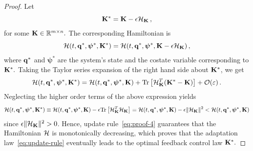 \documentclass[
12pt,draftcls,onecolumn%
]{IEEEtran}
\newtheorem{remark}{Remark}
\begin{document}
\begin{proof}
Let 
%
\begin{equation}
{\bf K}^* = {\bf K} - \epsilon {\cal H}_{{\bf K}} \thinspace ,
\label{eq:proof-4}
\end{equation}
%
for some ${\bf K} \in \mathbb{R}^{m\times n}.$  The corresponding Hamiltonian is 
%
\begin{equation*}
{\cal H} (t,{\bf q}^*,\bm{\psi}^*,{\bf K}^*) 
={\cal H} (t,{\bf q}^*,\bm{\psi}^*,{\bf K}-\epsilon {\cal H}_{{\bf K}}) \thinspace ,
\end{equation*}
%
where ${\bf q}^*$ and $\bm{\psi}^*$ are the system's state and the costate variable corresponding to ${\bf K}^*.$ Taking the Taylor series expansion of the right hand side about ${\bf K}^*$, we get
%
\begin{equation*}
  {\cal H} (t,{\bf q}^*,\bm{\psi}^*,{\bf K}^*)  = {\cal H} (t,{\bf q}^*,\bm{\psi}^*,{\bf K}) 
  +\mathrm{Tr} \left[{\cal H}_{{\bf K}}^T{\bf (K^*-K)}\right]+{\cal O}(\varepsilon) \thinspace .
\end{equation*}
%
Neglecting the higher order terms of the above expression yields
%
\begin{equation*}
\begin{split}
  {\cal H} (t,{\bf q}^*,\bm{\psi}^*,{\bf K}^*) \equiv {\cal H} (t,{\bf q}^*,\bm{\psi}^*,{\bf K}) 
  -\epsilon \mathrm{Tr}\left[{\cal H}_{{\bf K}}^T {\cal H}_{{\bf K}}\right]
   = {\cal H} (t,{\bf q}^*,\bm{\psi}^*,{\bf K}) -\epsilon\|{\cal H}_{{\bf K}}\|^2
 < {\cal H} (t,{\bf q}^*,\bm{\psi}^*,{\bf K}) 
\end{split}
\end{equation*}
%
since $\epsilon\|{\cal H}_{{\bf K}}\|^2 > 0$. Hence, update rule~\eqref{eq:proof-4} guarantees that the Hamiltonian ${\cal H}$ is monotonically decreasing, which proves that the adaptation law~\eqref{eq:update-rule} eventually leads to the optimal feedback control law ${\bf K}^*.$
\end{proof}
%
\end{document}
